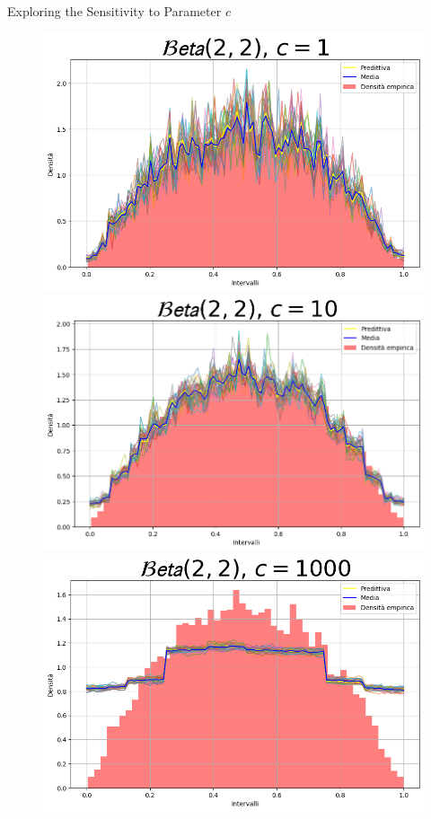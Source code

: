 \documentclass{beamer}
\begin{document}
\begin{frame}{Exploring the Sensitivity to Parameter \(c\)}
\bigskip
    \begin{figure}
        \begin{minipage}{0.32\textwidth}
            \centering
            \includegraphics[width=\textwidth]{Betac1.png}
        \end{minipage}
        \hfill
        \begin{minipage}{0.32\textwidth}
            \centering
            \includegraphics[width=\textwidth]{Betac10.png}
        \end{minipage}
        \hfill
        \begin{minipage}{0.32\textwidth}
            \centering
            \includegraphics[width=\textwidth]{Betac1000.png}

\end{minipage}
\end{figure}
\end{frame}
\end{document}

